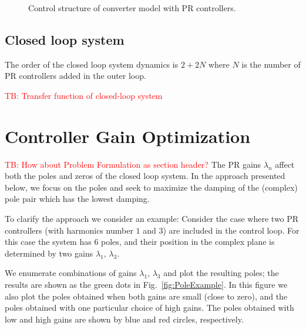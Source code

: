 \documentclass[conference,10pt]{IEEEtran}
\newcommand{\tb}[1]{\textcolor{red}{TB: #1}}
\begin{document}
\begin{figure}[!h]
\centering

\caption{Control structure of converter model with PR controllers.}
\label{fig:ControlStructure}
\end{figure}


\subsection{Closed loop system}

The order of the closed loop system dynamics is $2+2N$ where $N$ is the number of PR controllers added in the outer loop.

\tb{Transfer function of closed-loop system}


\section{Controller Gain Optimization}
\tb{How about Problem Formulation as section header?}
The PR gains $\lambda_n$ affect both the poles and zeros of the closed loop system. In the approach presented below, we focus on the poles and seek to maximize the damping of the (complex) pole pair which has the lowest damping.

To clarify the approach we consider an example: Consider the case where two PR controllers (with harmonics number $1$ and $3$) are included in the control loop. For this case the system has $6$ poles, and their position in the complex plane is determined by  two gains $\lambda_1$, $\lambda_3$.

We enumerate combinations of gains $\lambda_1$, $\lambda_3$ and plot the resulting poles; the results are shown as the green dots in Fig.~\ref{fig:PoleExample}. In this figure we also plot the poles obtained when both gains are small (close to zero), and the poles obtained with one particular choice of high gains. The poles obtained with low and high gains are shown by blue and red circles, respectively.
\end{document}
